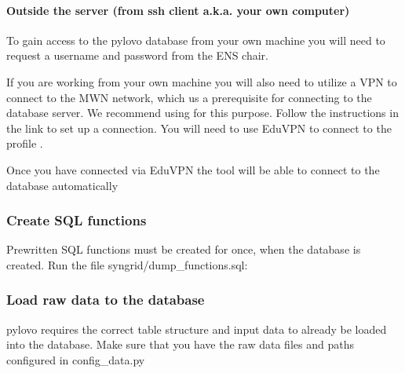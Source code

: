 \documentclass[letterpaper,10pt,english]{sphinxmanual}
\begin{document}
\paragraph{Outside the server (from ssh client a.k.a. your own computer)}
\label{\detokenize{docs_pylovo/installation:outside-the-server-from-ssh-client-a-k-a-your-own-computer}}
\begin{DUlineblock}{0em}
\item[] To gain access to the pylovo database from your own machine you will need to request a username and password from the ENS chair.
\item[] If you are working from your own machine you will also need to utilize a VPN to connect to the MWN network,
which us a prerequisite for connecting to the database server. We recommend using  for this purpose.
Follow the instructions in the link to set up a connection. You will need to use EduVPN to connect to the profile
.
\end{DUlineblock}

\begin{DUlineblock}{0em}
\item[] Once you have connected via EduVPN the tool will be able to connect to the database automatically
\end{DUlineblock}


\subsubsection{Create SQL functions}
\label{\detokenize{docs_pylovo/installation:create-sql-functions}}
\sphinxAtStartPar
Prewritten SQL functions must be created for once, when the database is created. Run the file syngrid/dump\_functions.sql:

\begin{sphinxVerbatim}[commandchars=\\\{\}]
     
\end{sphinxVerbatim}


\subsubsection{Load raw data to the database}
\label{\detokenize{docs_pylovo/installation:load-raw-data-to-the-database}}
\begin{DUlineblock}{0em}
\item[] pylovo requires the correct table structure and input data to already be loaded into the database.
Make sure that you have the raw data files and paths configured in config\_data.py
\end{DUlineblock}
\end{document}
